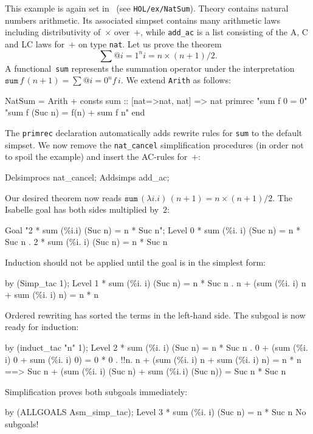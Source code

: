 This example is again set in \HOL\ (see \texttt{HOL/ex/NatSum}).
Theory  contains natural numbers arithmetic.  Its
associated simpset contains many arithmetic laws including
distributivity of~$\times$ over~$+$, while \texttt{add_ac} is a list
consisting of the A, C and LC laws for~$+$ on type \texttt{nat}.  Let
us prove the theorem
\[ \sum@{i=1}^n i = n\times(n+1)/2. \]
%
A functional~\texttt{sum} represents the summation operator under the
interpretation $\texttt{sum} \, f \, (n + 1) = \sum@{i=0}^n f\,i$.  We
extend \texttt{Arith} as follows:
\begin{ttbox}
NatSum = Arith +
consts sum     :: [nat=>nat, nat] => nat
primrec 
  "sum f 0 = 0"
  "sum f (Suc n) = f(n) + sum f n"
end
\end{ttbox}
The \texttt{primrec} declaration automatically adds rewrite rules for
\texttt{sum} to the default simpset.  We now remove the
\texttt{nat_cancel} simplification procedures (in order not to spoil
the example) and insert the AC-rules for~$+$:
\begin{ttbox}
Delsimprocs nat_cancel;
Addsimps add_ac;
\end{ttbox}
Our desired theorem now reads $\texttt{sum} \, (\lambda i.i) \, (n+1) =
n\times(n+1)/2$.  The Isabelle goal has both sides multiplied by~$2$:
\begin{ttbox}
Goal "2 * sum (\%i.i) (Suc n) = n * Suc n";
{\out Level 0}
{ * sum (\%i. i) (Suc n) = n * Suc n}
{. 2 * sum (\%i. i) (Suc n) = n * Suc n}
\end{ttbox}
Induction should not be applied until the goal is in the simplest
form:
\begin{ttbox}
by (Simp_tac 1);
{\out Level 1}
{ * sum (\%i. i) (Suc n) = n * Suc n}
{. n + (sum (\%i. i) n + sum (\%i. i) n) = n * n}
\end{ttbox}
Ordered rewriting has sorted the terms in the left-hand side.  The
subgoal is now ready for induction:
\begin{ttbox}
by (induct_tac "n" 1);
{\out Level 2}
{ * sum (\%i. i) (Suc n) = n * Suc n}
{. 0 + (sum (\%i. i) 0 + sum (\%i. i) 0) = 0 * 0}
\ttbreak
{. !!n. n + (sum (\%i. i) n + sum (\%i. i) n) = n * n}
{\out           ==> Suc n + (sum (\%i. i) (Suc n) + sum (\%i.\,i) (Suc n)) =}
{\out               Suc n * Suc n}
\end{ttbox}
Simplification proves both subgoals immediately:
\begin{ttbox}
by (ALLGOALS Asm_simp_tac);
{\out Level 3}
{ * sum (\%i. i) (Suc n) = n * Suc n}
{\out No subgoals!}
\end{ttbox}
